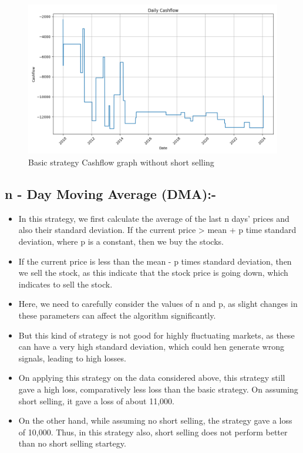 \documentclass[11pt]{article}
\begin{document}
\begin{figure}[H]
  \centering
  \includegraphics[width=1\textwidth]{Basic_without_short.png}
  \caption{Basic strategy Cashflow graph without short selling}
\end{figure}

\subsection{n - Day Moving Average (DMA):-}
\begin{itemize}
    \item In this strategy, we first calculate the average of the last n days' prices and also their standard deviation. If the current price > mean + p time standard deviation, where p is a constant, then we buy the stocks.
    \item If the current price is less than the mean - p times standard deviation, then we sell the stock, as this indicate that the stock price is going down, which indicates to sell the stock.
    \item Here, we need to carefully consider the values of n and p, as slight changes in these parameters can affect the algorithm significantly.
    \item But this kind of strategy is not good for highly fluctuating markets, as these can have a very high standard deviation, which could hen generate wrong signals, leading to high losses.
    \item On applying this strategy on the data considered above, this strategy still gave a high loss, comparatively less loss than the basic strategy. On assuming short selling, it gave a loss of about 11,000.
    \item On the other hand, while assuming no short selling, the strategy gave a loss of 10,000. Thus, in this strategy also, short selling does not perform better than no short selling startegy.
\end{itemize}
\end{document}
